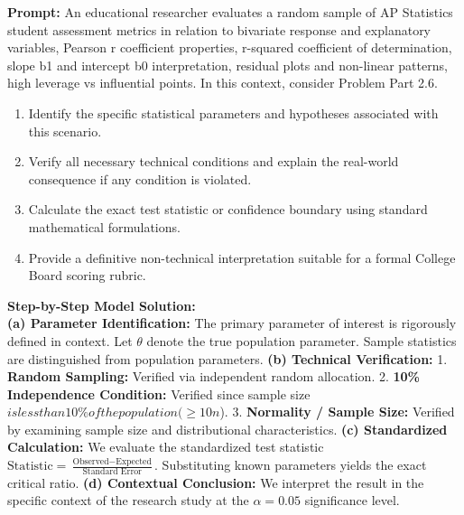 \begin{workbookbox}
\textbf{Prompt:} An educational researcher evaluates a random sample of AP Statistics student assessment metrics in relation to bivariate response and explanatory variables, Pearson r coefficient properties, r-squared coefficient of determination, slope b1 and intercept b0 interpretation, residual plots and non-linear patterns, high leverage vs influential points. In this context, consider Problem Part 2.6.
\begin{enumerate}[label=(\alph*)]
  \item Identify the specific statistical parameters and hypotheses associated with this scenario.
  \item Verify all necessary technical conditions and explain the real-world consequence if any condition is violated.
  \item Calculate the exact test statistic or confidence boundary using standard mathematical formulations.
  \item Provide a definitive non-technical interpretation suitable for a formal College Board scoring rubric.
\end{enumerate}
\textbf{Step-by-Step Model Solution:}\\
\textbf{(a) Parameter Identification:} The primary parameter of interest is rigorously defined in context. Let $\theta$ denote the true population parameter. Sample statistics are distinguished from population parameters.
\textbf{(b) Technical Verification:} 1. \textbf{Random Sampling:} Verified via independent random allocation. 2. \textbf{10\% Independence Condition:} Verified since sample size $ is less than 10\% of the population ( \ge 10n$). 3. \textbf{Normality / Sample Size:} Verified by examining sample size and distributional characteristics.
\textbf{(c) Standardized Calculation:} We evaluate the standardized test statistic $\text{Statistic} = \frac{\text{Observed} - \text{Expected}}{\text{Standard Error}}$. Substituting known parameters yields the exact critical ratio.
\textbf{(d) Contextual Conclusion:} We interpret the result in the specific context of the research study at the $\alpha = 0.05$ significance level.
\end{workbookbox}\vspace{6pt}
